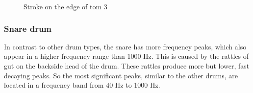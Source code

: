 \begin{figure}
	\centering
	\caption{Stroke on the edge of tom 3}
	\label{fig:tom33}
\end{figure}


\subsubsection{Snare drum}

In contrast to other drum types, the snare has more frequency peaks, which also appear in a higher frequency range than 1000 Hz. This is caused by the rattles of gut on the backside head of the drum. These rattles produce more but lower, fast decaying peaks. So the most significant peaks, similar to the other drums, are located in a frequency band from 40 Hz to 1000 Hz. 

